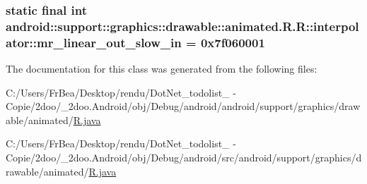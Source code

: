 \hypertarget{classandroid_1_1support_1_1graphics_1_1drawable_1_1animated_1_1_r_1_1interpolator_2ebb7db1a5d373c0f2c91970a68a4942}{
\subsubsection[{mr\_\-linear\_\-out\_\-slow\_\-in}]{\setlength{\rightskip}{0pt plus 5cm}static final int android::support::graphics::drawable::animated.R.R::interpolator::mr\_\-linear\_\-out\_\-slow\_\-in = 0x7f060001}}
\label{classandroid_1_1support_1_1graphics_1_1drawable_1_1animated_1_1_r_1_1interpolator_2ebb7db1a5d373c0f2c91970a68a4942}




The documentation for this class was generated from the following files:\begin{CompactItemize}
\item 
C:/Users/FrBea/Desktop/rendu/DotNet\_\-todolist\_ - Copie/2doo/\_\-2doo.Android/obj/Debug/android/android/support/graphics/drawable/animated/\hyperlink{android_2support_2graphics_2drawable_2animated_2_r_8java}{R.java}\item 
C:/Users/FrBea/Desktop/rendu/DotNet\_\-todolist\_ - Copie/2doo/\_\-2doo.Android/obj/Debug/android/src/android/support/graphics/drawable/animated/\hyperlink{src_2android_2support_2graphics_2drawable_2animated_2_r_8java}{R.java}\end{CompactItemize}
